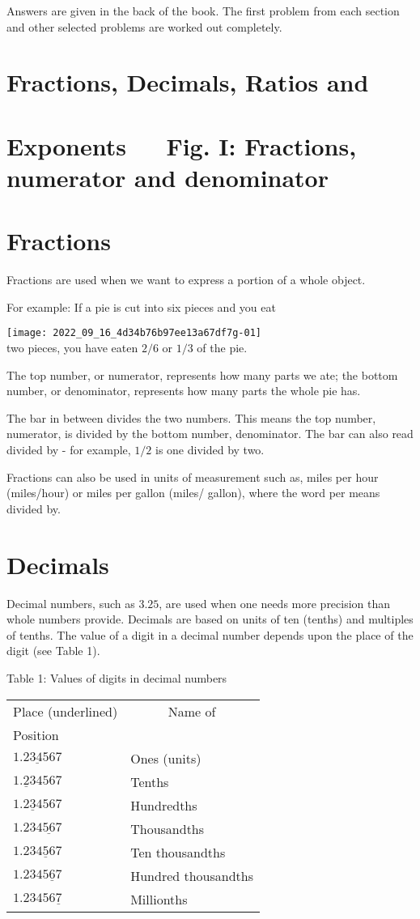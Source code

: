 \begin{enumerate}
Answers are given in the back of the book. The first problem from each section and other selected problems are worked out completely.

\section{Fractions, Decimals, Ratios and}
\section{Exponents $\quad$ Fig. I: Fractions, numerator and denominator}
\section{Fractions}
Fractions are used when we want to express a portion of a whole object.

For example: If a pie is cut into six pieces and you eat

\texttt{[image: 2022\_09\_16\_4d34b76b97ee13a67df7g-01]}\\
two pieces, you have eaten $2 / 6$ or $1 / 3$ of the pie.

The top number, or numerator, represents how many parts we ate; the bottom number, or denominator, represents how many parts the whole pie has.

The bar in between divides the two numbers. This means the top number, numerator, is divided by the bottom number, denominator. The bar can also read divided by - for example, $1 / 2$ is one divided by two.

Fractions can also be used in units of measurement such as, miles per hour (miles/hour) or miles per gallon (miles/ gallon), where the word per means divided by.

\section{Decimals}
Decimal numbers, such as $3.25$, are used when one needs more precision than whole numbers provide. Decimals are based on units of ten (tenths) and multiples of tenths. The value of a digit in a decimal number depends upon the place of the digit (see Table 1).

Table 1: Values of digits in decimal numbers

\begin{tabular}{|ll}
\multicolumn{1}{c}{Place (underlined)} & \multicolumn{1}{c}{Name of} \\
Position &  \\
$\underline{1.234567}$ & Ones (units) \\
$1 . \underline{2} 34567$ & Tenths \\
$1.2 \underline{3} 4567$ & Hundredths \\
$1.23 \underline{4567}$ & Thousandths \\
$1.234 \underline{5} 67$ & Ten thousandths \\
$1.2345 \underline{6} 7$ & Hundred thousandths \\
$1.23456 \underline{7}$ & Millionths \\
\hline
\end{tabular}


\end{enumerate}
